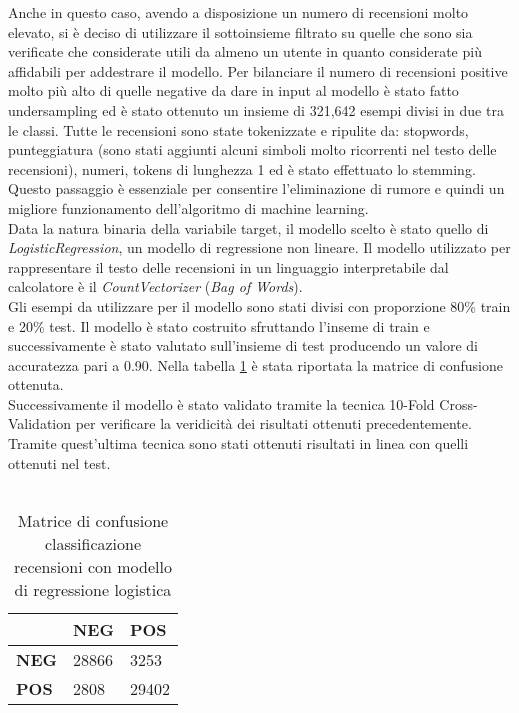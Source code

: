 Anche in questo caso, avendo a disposizione un numero di recensioni molto elevato, si è deciso di utilizzare il sottoinsieme filtrato su quelle che sono sia verificate che considerate utili da almeno un utente in quanto considerate più affidabili per addestrare il modello. Per bilanciare il numero di recensioni positive molto più alto di quelle negative da dare in input al modello è stato fatto undersampling ed è stato ottenuto un insieme di 321,642 esempi divisi in due tra le classi. 
Tutte le recensioni sono state tokenizzate e ripulite da: stopwords, punteggiatura (sono stati aggiunti alcuni simboli molto ricorrenti nel testo delle recensioni), numeri, tokens di lunghezza 1 ed è stato effettuato lo stemming. Questo passaggio è essenziale per consentire l'eliminazione di rumore e quindi un migliore funzionamento dell'algoritmo di machine learning. \\
Data la natura binaria della variabile target, il modello scelto è stato quello di \textit{LogisticRegression}, un modello di regressione non lineare. Il modello utilizzato per rappresentare il testo delle recensioni in un linguaggio interpretabile dal calcolatore è il \textit{CountVectorizer} (\textit{Bag of Words}).\\
Gli esempi da utilizzare per il modello sono stati divisi con proporzione 80\% train e 20\% test. Il modello è stato costruito sfruttando l'inseme di train e successivamente è stato valutato sull'insieme di test producendo un valore di accuratezza pari a 0.90. Nella tabella \ref{tab:matriceConfusioneModello} è stata riportata la matrice di confusione ottenuta. 
\\
Successivamente il modello è stato validato tramite la tecnica 10-Fold Cross-Validation per verificare la veridicità dei risultati ottenuti precedentemente. Tramite quest'ultima tecnica sono stati ottenuti risultati in linea con quelli ottenuti nel test.\\\\
\begin{table}[H]\centering
    \begin{tabular}{l|l|l|}
    \cline{2-3}
     & \textbf{NEG} & \textbf{POS} \\ \hline
    \multicolumn{1}{|l|}{\textbf{NEG}} & 28866 & 3253 \\ \hline
    \multicolumn{1}{|l|}{\textbf{POS}} & 2808 & 29402 \\ \hline
    \end{tabular}
    \caption{Matrice di confusione classificazione recensioni con modello di regressione logistica}
    \label{tab:matriceConfusioneModello}
\end{table}

